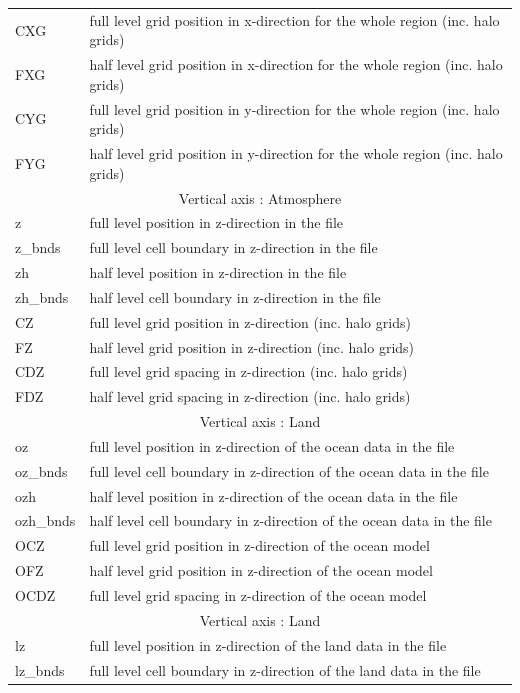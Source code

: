 \begin{longtable}{l|l}
CXG & full level grid position in x-direction for the whole region (inc. halo grids) \\
FXG & half level grid position in x-direction for the whole region (inc. halo grids) \\
CYG & full level grid position in y-direction for the whole region (inc. halo grids) \\
FYG & half level grid position in y-direction for the whole region (inc. halo grids) \\ \hline
\multicolumn{2}{c}{Vertical axis : Atmosphere}\\ \hline
z         & full level position in z-direction in the file \\
z\_bnds   & full level cell boundary in z-direction in the file \\
zh        & half level position in z-direction in the file \\
zh\_bnds  & half level cell boundary in z-direction in the file \\
CZ  & full level grid position in z-direction (inc. halo grids) \\
FZ  & half level grid position in z-direction (inc. halo grids) \\
CDZ & full level grid spacing  in z-direction (inc. halo grids) \\
FDZ & half level grid spacing  in z-direction (inc. halo grids) \\ \hline
\multicolumn{2}{c}{Vertical axis : Land}\\ \hline
oz        & full level position in z-direction of the ocean data in the file \\
oz\_bnds  & full level cell boundary in z-direction of the ocean data in the file \\
ozh       & half level position in z-direction of the ocean data in the file \\
ozh\_bnds & half level cell boundary in z-direction of the ocean data in the file \\
OCZ  & full level grid position in z-direction of the ocean model \\
OFZ  & half level grid position in z-direction of the ocean model \\
OCDZ & full level grid spacing in z-direction of the ocean model \\  \hline
\multicolumn{2}{c}{Vertical axis : Land}\\ \hline
lz        & full level position in z-direction of the land data in the file \\
lz\_bnds  & full level cell boundary in z-direction of the land data in the file \\

\end{longtable}
